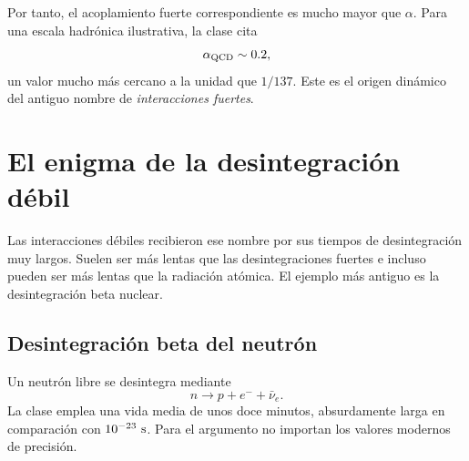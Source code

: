 Por tanto, el acoplamiento fuerte correspondiente es mucho mayor que \(\alpha\). Para una escala hadrónica ilustrativa, la clase cita
\begin{equation}
\alpha_{\rm QCD}\sim0.2,
\end{equation}
un valor mucho más cercano a la unidad que \(1/137\). Este es el origen dinámico del antiguo nombre de \emph{interacciones fuertes}.

\begin{classroomqa}\end{classroomqa}

\begin{classroomqa}\end{classroomqa}

\section{El enigma de la desintegración débil}

Las interacciones débiles recibieron ese nombre por sus tiempos de desintegración muy largos. Suelen ser más lentas que las desintegraciones fuertes e incluso pueden ser más lentas que la radiación atómica. El ejemplo más antiguo es la desintegración beta nuclear.

\subsection{Desintegración beta del neutrón}

Un neutrón libre se desintegra mediante
\begin{equation}
n\longrightarrow p+e^-+\bar\nu_e.
\label{eq:l5-neutron-decay-intro}
\end{equation}
La clase emplea una vida media de unos doce minutos, absurdamente larga en comparación con \(10^{-23}\ {\rm s}\). Para el argumento no importan los valores modernos de precisión.

